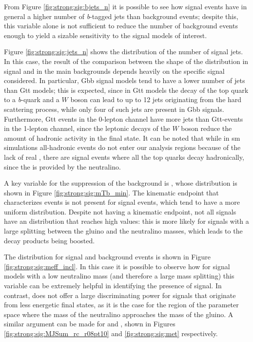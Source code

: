 From Figure \ref{fig:strong:sig:bjets_n} it is possible to see how signal events have in general a higher number of 
\textit{b}-tagged jets than background events; despite this, this variable alone is not sufficient to reduce the number of 
background events enough to 
yield a sizable sensitivity to the signal models of interest.

Figure \ref{fig:strong:sig:jets_n} shows the distribution of the number of signal jets. 
In this case, the result of the comparison between the shape of the distribution in signal and in the main backgrounds depends heavily 
on the specific signal considered. In particular, Gbb signal models tend to have a lower number of jets than Gtt models; 
this is expected, since in Gtt models the decay of the top quark to a \textit{b}-quark and a $W$ boson can lead to up to 12 jets originating from the 
hard scattering process, while only four of such jets are present in Gbb signals. 
Furthermore, Gtt events in the 0-lepton channel have more jets than Gtt-events in the 1-lepton channel, since the leptonic decays of the $W$ boson 
reduce the amount of hadronic activity in the final state. 
It can be noted that while in \gls{sm} simulations all-hadronic \ttbar events do not enter our analysis regions because of the lack of real \met,  there are signal events where all the top quarks decay hadronically, since the \met is provided by the neutralino. 

A key variable for the suppression of the \ttbar background is \mtb, whose distribution is shown in Figure \ref{fig:strong:sig:mTb_min}.
The kinematic endpoint that characterizes \ttbar events is not present for signal events, which tend to have a more uniform distribution.
Despite not having a kinematic endpoint, not all signals have an \mtb distribution that reaches high values: this is more likely for 
signals with a large splitting between the gluino and the neutralino masses, which leads to the decay products being boosted.

The \meff distribution for signal and background events is shown in Figure \ref{fig:strong:sig:meff_incl}. 
In this case it is possible to observe how for signal models with a low neutralino mass (and therefore a large mass splitting)
this variable can be extremely helpful in identifying the presence of signal. 
In contrast, \meff does not offer a large discriminating power for signals that originate from less energetic final states, as it is the 
case for the region of the parameter space where the mass of the neutralino approaches the mass of the gluino.
A similar argument can be made for \mjsum and \met, shown in Figures \ref{fig:strong:sig:MJSum_rc_r08pt10} and \ref{fig:strong:sig:met} respectively. 


